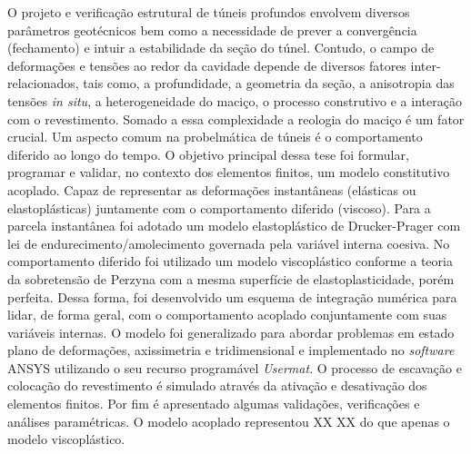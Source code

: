 O projeto e verificação estrutural de túneis profundos envolvem diversos parâmetros geotécnicos bem como a necessidade de prever a convergência (fechamento) e intuir a estabilidade da seção do túnel. Contudo, o campo de deformações e tensões ao redor da cavidade depende de diversos fatores inter-relacionados, tais como, a profundidade, a geometria da seção, a anisotropia das tensões \textit{in situ}, a heterogeneidade do maciço, o processo construtivo e a interação com o revestimento. Somado a essa complexidade a reologia do maciço é um fator crucial. Um aspecto comum na probelmática de túneis é o comportamento diferido ao longo do tempo. O objetivo principal dessa tese foi formular, programar e validar, no contexto dos elementos finitos, um modelo constitutivo acoplado. Capaz de representar as deformações instantâneas (elásticas ou elastoplásticas) juntamente com o comportamento diferido (viscoso). Para a parcela instantânea foi adotado um modelo elastoplástico de Drucker-Prager com lei de endurecimento/amolecimento governada pela variável interna coesiva. No comportamento diferido foi utilizado um modelo viscoplástico conforme a teoria da sobretensão de Perzyna com a mesma superfície de elastoplasticidade, porém perfeita. Dessa forma, foi desenvolvido um esquema de integração numérica para lidar, de forma geral, com o comportamento acoplado conjuntamente com suas variáveis internas. O modelo foi generalizado para abordar problemas em estado plano de deformações, axissimetria e tridimensional e implementado no \textit{software} ANSYS utilizando o seu recurso programável \textit{Usermat}. O processo de escavação e colocação do revestimento é simulado através da ativação e desativação dos elementos finitos. Por fim é apresentado algumas validações, verificações e análises paramétricas. O modelo acoplado representou XX XX do que apenas o modelo viscoplástico. 